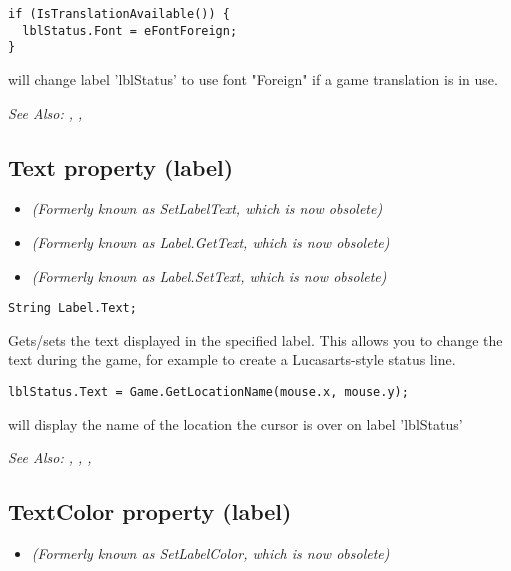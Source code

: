 \begin{verbatim}
if (IsTranslationAvailable()) {
  lblStatus.Font = eFontForeign;
}
\end{verbatim}

will change label 'lblStatus' to use font "Foreign" if a game translation is in use.

\it{See Also:} ,
, 


\subsection{Text property (label)}\label{Label.Text}%

\begin{itemize}
\item \it{(Formerly known as SetLabelText, which is now obsolete)}
\item \it{(Formerly known as Label.GetText, which is now obsolete)}
\item \it{(Formerly known as Label.SetText, which is now obsolete)}
\end{itemize}

\begin{verbatim}
String Label.Text;
\end{verbatim}
Gets/sets the text displayed in the specified label.  This allows you to change
the text during the game, for example to create a Lucasarts-style status line.

\begin{verbatim}
lblStatus.Text = Game.GetLocationName(mouse.x, mouse.y);
\end{verbatim}
will display the name of the location the cursor is over on label 'lblStatus'

\it{See Also:} ,
,
, 


\subsection{TextColor property (label)}\label{Label.TextColor}%

\begin{itemize}
\item \it{(Formerly known as SetLabelColor, which is now obsolete)}
\end{itemize}

